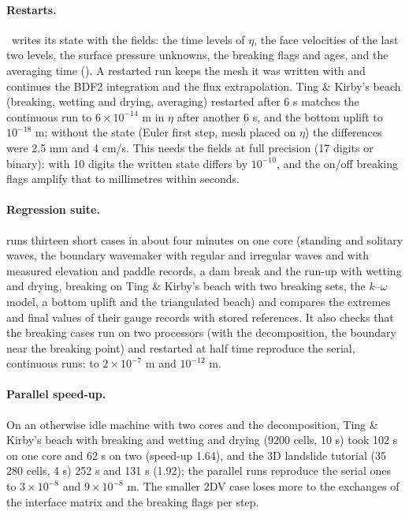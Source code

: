 \paragraph{Restarts.} \NHFOAM\ writes its state with the fields: the time
levels of $\eta$, the face velocities of the last two levels, the surface
pressure unknowns, the breaking flags and ages, and the averaging time
(). A restarted run keeps the mesh it was written
with and continues the BDF2 integration and the flux extrapolation. Ting \&
Kirby's beach (breaking, wetting and drying, averaging) restarted after 6 s
matches the continuous run to $6\times10^{-14}$ m in $\eta$ after another
6 s, and the bottom uplift to $10^{-18}$ m; without the state (Euler first
step, mesh placed on $\eta$) the differences were 2.5 mm and 4 cm/s. This
needs the fields at full precision (17 digits or binary): with 10 digits the
written state differs by $10^{-10}$, and the on/off breaking flags amplify
that to millimetres within seconds.

\paragraph{Regression suite.}  runs thirteen short
cases in about four minutes on one core (standing and solitary waves, the
boundary wavemaker with regular and irregular waves and with measured
elevation and paddle records, a dam break and the
run-up with wetting and drying, breaking on Ting \& Kirby's beach with two
breaking sets, the
$k$--$\omega$ model, a bottom uplift and the triangulated beach) and compares
the extremes and final values of their gauge records with stored references.
It also checks that the breaking cases run on two processors (with the
 decomposition, the boundary near the breaking point) and
restarted at half time reproduce the serial, continuous runs: to
$2\times10^{-7}$ m and $10^{-12}$ m.

\paragraph{Parallel speed-up.} On an otherwise idle machine with two cores
and the  decomposition, Ting \& Kirby's beach with
breaking and wetting and drying (9200 cells, 10 s) took 102 s on one core
and 62 s on two (speed-up 1.64), and the 3D landslide tutorial (35\,280
cells, 4 s) 252 s and 131 s (1.92); the parallel runs reproduce the serial
ones to $3\times10^{-8}$ and $9\times10^{-8}$ m. The smaller 2DV case loses
more to the exchanges of the interface matrix and the breaking flags per
step.
